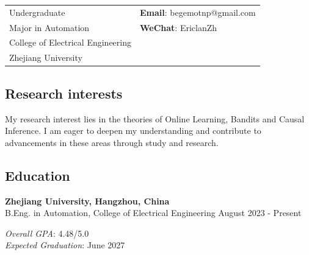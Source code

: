 \documentclass[letterpaper, 12pt]{article}
\begin{document}


\vspace{0.5cm} 

\begin{tabular}{ll}
\hspace{-0.9cm} Undergraduate & \hspace{3cm} \textbf{Email}: 
begemotnp@gmail.com\\
\hspace{-0.8cm}Major in Automation& \hspace{3cm} \textbf{WeChat}: EriclanZh\\
\hspace{-0.8cm}College of Electrical Engineering                 & \\
\hspace{-0.8cm}Zhejiang University& \end{tabular}



\subsection*{\color{OliveGreen} Research interests}
My research interest lies in the theories of Online Learning, Bandits and Causal Inference. I am eager to deepen my understanding and contribute to advancements in these areas through study and research. 

\subsection*{\color{OliveGreen} Education }

\begin{flushleft}
    \textbf{Zhejiang University, Hangzhou, China }   \\
   B.Eng. in Automation, College of Electrical Engineering  \hfill August 2023 - Present

\textit{Overall GPA}: 4.48/5.0\\
\textit{Expected Graduation}: June 2027 \\

\end{flushleft}
\end{document}
